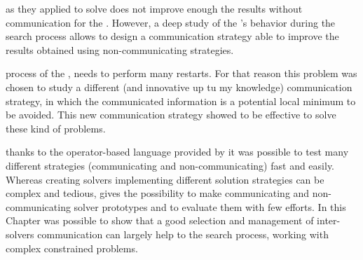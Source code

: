  as they applied to solve \sgp{} does not improve enough the results without communication for the \nqp{}. However, a deep study of the \posl's behavior during the search process allows to design a communication strategy able to improve the results obtained using non-communicating strategies.


 process of the \grp{}, \posl{} needs to perform many restarts. For that reason this problem was chosen to study a different (and innovative up tu my knowledge) communication strategy, in which the communicated information is a potential local minimum to be avoided. This new communication strategy showed to be effective to solve these kind of problems.

 thanks to the operator-based language provided by \posl{} it was possible to test many different strategies (communicating and non-communicating) fast and easily. Whereas creating solvers implementing different solution strategies can be complex and tedious, \posl{} gives the possibility to make communicating and non-communicating solver prototypes and to evaluate them with few efforts. In this Chapter was possible to show that a good selection and management of inter-solvers communication can largely help to the search process, working with complex constrained problems.

